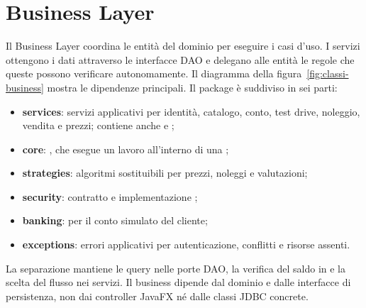 \section{Business Layer}\label{sec:business-layer}

Il Business Layer coordina le entità del dominio per eseguire i casi d'uso. I servizi ottengono i dati attraverso le interfacce DAO e delegano alle entità le regole che queste possono verificare autonomamente. Il diagramma della figura~\ref{fig:classi-business} mostra le dipendenze principali. Il package  è suddiviso in sei parti:
\begin{itemize}
  \item \textbf{services}: servizi applicativi per identità, catalogo, conto, test drive, noleggio, vendita e prezzi; contiene anche  e ;
  \item \textbf{core}: , che esegue un lavoro all'interno di una ;
  \item \textbf{strategies}: algoritmi sostituibili per prezzi, noleggi e valutazioni;
  \item \textbf{security}: contratto  e implementazione ;
  \item \textbf{banking}:  per il conto simulato del cliente;
  \item \textbf{exceptions}: errori applicativi per autenticazione, conflitti e risorse assenti.
\end{itemize}
La separazione mantiene le query nelle porte DAO, la verifica del saldo in  e la scelta del flusso nei servizi. Il business dipende dal dominio e dalle interfacce di persistenza, non dai controller JavaFX né dalle classi JDBC concrete.


